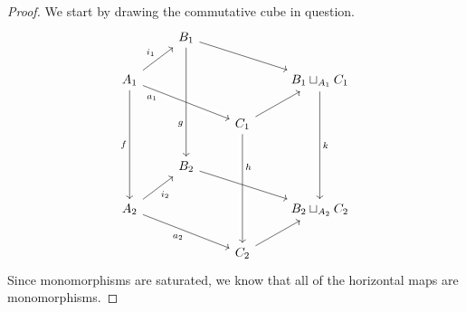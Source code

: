 \documentclass[a4paper,11pt,openany]{scrartcl}
\begin{document}
~\\
\begin{proof}
    We start by drawing the commutative cube in question.
    \[\begin{tikzcd}
        & {B_1} \\
        {A_1} &&& {B_1\sqcup_{A_1}C_1} \\
        && {C_1} \\
        & {B_2} \\
        {A_2} &&& {B_2\sqcup_{A_2}C_2} \\
        && {C_2}
        \arrow["h"{pos=0.3}, from=3-3, to=6-3, crossing over]
        \arrow["{a_2}"', from=5-1, to=6-3]
        \arrow[from=6-3, to=5-4]
        \arrow["{i_2}"', from=5-1, to=4-2]
        \arrow[from=4-2, to=5-4]
        \arrow["k", from=2-4, to=5-4]
        \arrow["f"', from=2-1, to=5-1]
        \arrow["{a_1}"'{pos=0.2}, from=2-1, to=3-3, crossing over]
        \arrow[from=1-2, to=2-4]
        \arrow[from=3-3, to=2-4]
        \arrow["{i_1}", from=2-1, to=1-2]
        \arrow["g"'{pos=0.7}, from=1-2, to=4-2]
    \end{tikzcd}\]
    Since monomorphisms are saturated, we know that all of the horizontal maps
    are monomorphisms.


\end{proof}
\end{document}
